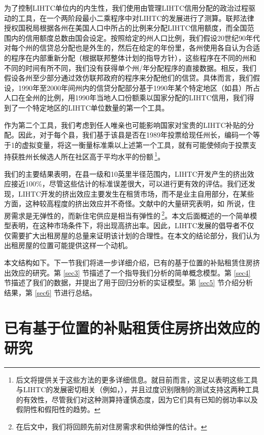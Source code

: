 \documentclass[lang=cn,11pt,a4paper]{paper}
\begin{document}
为了控制LIHTC单位内的内生性，我们使用由管理LIHTC信用分配的政治过程驱动的工具，在一个两阶段最小二乘程序中对LIHTC的发展进行了测算。联邦法律授权国税局根据各州在美国人口中所占的比例来分配LIHTC信用额度，而全国范围内的信用额度总数由国会设定。按照给定的州人口比例，我们假设20世纪90年代对每个州的信贷总分配也是外生的，然后在给定的年份里，各州使用各自认为合适的程序在内部重新分配（根据联邦整体计划的指导方针），这些程序在不同的州和不同的时间有所不同，我们没有获得单个州/年分配程序的直接数据。相反，我们假设各州至少部分通过效仿联邦政府的程序来分配他们的信贷。具体而言，我们假设，1990年至2000年间州内的信贷分配部分基于1990年某个特定地区（如县）所占人口在全州的比例，用1990年当地人口份额乘以国家分配的LIHTC信用，我们得到了一个特定地区的LIHTC单位数量的第一个工具。

作为第二个工具，我们考虑到任人唯亲也可能影响国家对宝贵的LIHTC补贴的分配。因此，对于每个县，我们基于该县是否在1989年投票给现任州长，编码一个等于1的虚拟变量，将这一衡量标准乘以上述第一个工具，就有可能使倾向于投票支持获胜州长候选人所在社区高于平均水平的份额\,\footnote{后文将提供关于这些方法的更多详细信息。就目前而言，这足以表明这些工具与LIHTC的发展密切相关（例如，\citep{Stock200580,Murray2006111}），并且过度识别限制的测试支持这两种工具的有效性，尽管我们对这种测算持谨慎态度，因为它们具有已知的弱功率以及假阴性和假阳性的趋势。}。

我们的主要结果表明，在县一级和10英里半径范围内，LIHTC开发产生的挤出效应接近100\%，尽管这些估计的标准误差很大，可以进行更有效的评估。我们还发现，LIHTC开发的挤出效应主要发生在租赁市场，而不是业主自用部分，在某些方面，这种较高程度的挤出效应并不奇怪。文献中的大量研究表明，如 \cite{Hanushek1980449} 所说，住房需求是无弹性的，而新住宅供应是相当有弹性的\,\footnote{在后文中，我们将回顾先前对住房需求和供给弹性的估计。}。本文后面概述的一个简单模型表明，在这种市场条件下，将出现高挤出率。因此，LIHTC发展的倡导者不仅仅需要扩大出租房屋的总量来证明该计划的合理性。在本文的结论部分，我们认为出租房屋的位置可能提供这样一个动机。

本文结构如下。下一节我们将进一步详细介绍，已有的基于位置的补贴租赁住房挤出效应的研究。第 \ref{sec3} 节描述了一个指导我们分析的简单概念模型。第 \ref{sec4} 节描述了我们的数据，并提出了用于回归分析的实证模型。第 \ref{sec5} 节介绍分析结果，第 \ref{sec6} 节进行总结。

\section{已有基于位置的补贴租赁住房挤出效应的研究}
\end{document}

